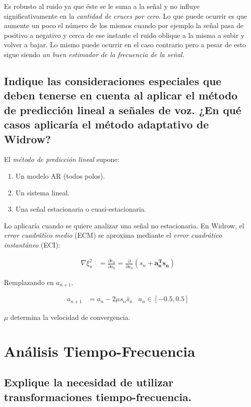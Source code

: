 \documentclass[a4paper,10pt,spanish,oneside]{article}
\begin{document}
Es robusto al ruido ya que éste se le suma a la señal y no influye significativamente en la \textit{cantidad de cruces por cero}. Lo que puede ocurrir es que aumente un poco el número de los mismos cuando por ejemplo la señal pasa de positivo a negativo y cerca de ese instante el ruido oblique a la misma a subir y volver a bajar. Lo mismo puede ocurrir en el caso contrario pero a pesar de esto sigue siendo \textit{un buen estimador de la frecuencia de la señal}.

\subsection{Indique las consideraciones especiales que deben tenerse en cuenta al aplicar el método de predicción lineal a señales de voz. ¿En qué casos aplicaría el método adaptativo de Widrow?}

El \textit{método de predicción lineal} supone:

\begin{enumerate}[1.]
\item Un modelo AR (todos polos).

\item Un sistema lineal.

\item Una señal estacionaria o cuasi-estacionaria.
\end{enumerate}

Lo aplicaría cuando se quiere analizar una señal no estacionaria. En Widrow, el \textit{error cuadrático medio} (ECM) se aproxima mediante el \textit{error cuadrático instantáneo} (ECI):

\begin{align*}
\nabla\xi_{n}^{2} &= \frac{\partial e_{n}}{\partial a_{n}}
=\frac{\partial}{\partial a_{n}}(s_{n}+\mathbf{a_{n}^{T}}\mathbf{s_{n}})
\end{align*}

Remplazando en $a_{n+1}$.

\begin{align*}
a_{n+1} &= a_{n}-2\mu s_{n}\hat{s}_{n} & a_{n}\in[-0.5,0.5]
\end{align*}

$\mu$ determina la velocidad de convergencia.

\section{Análisis Tiempo-Frecuencia}

\subsection{Explique la necesidad de utilizar transformaciones tiempo-frecuencia.}
\end{document}
